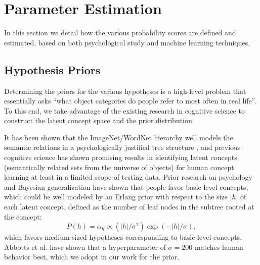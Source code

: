 \section{Parameter Estimation}
In this section we detail how the various probability scores are defined and estimated, based on both psychological study and machine learning techniques.

\subsection{Hypothesis Priors}
Determining the priors for the various hypotheses is a high-level problem that essentially asks ``what object categories do people refer to most often in real life''. To this end, we take advantage of the existing research in cognitive science to construct the latent concept space and the prior distribution.

It has been shown that the ImageNet/WordNet hierarchy \cite{fellbaum2010wordnet} well models the semantic relations in a psychologically justified tree structure \cite{markman1991categorization}, and previous cognitive science has shown promising results in identifying latent concepts (semantically related sets from the universe of objects) for human concept learning \cite{abbottconstructing,tenenbaum2006theory} at least in a limited scope of testing data. Prior research on psychology and Bayesian generalization \cite{shepard1987toward,tenenbaum2001generalization} have shown that people favor basic-level concepts, which could be well modeled by an Erlang prior with respect to the size $|h|$ of each latent concept, defined as the number of leaf nodes in the subtree rooted at the concept:
\begin{equation}
    P(h) = \alpha_h \propto (|h|/\sigma^2) \exp(-|h|/\sigma),
\end{equation}
which favors medium-sized hypotheses corresponding to basic level concepts. Abbotts et al. have shown that a hyperparameter of $\sigma=200$ matches human behavior best, which we adopt in our work for the prior.

